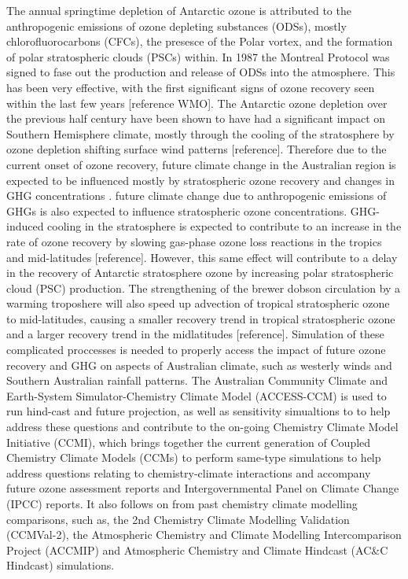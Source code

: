 The annual springtime depletion of Antarctic ozone is attributed to the anthropogenic emissions of ozone depleting substances (ODSs), mostly chlorofluorocarbons (CFCs), the presesce of the Polar vortex, and the formation of polar stratospheric clouds (PSCs) within. In 1987 the Montreal Protocol was signed to fase out the production and release of ODSs into the atmosphere. This has been very effective, with the first significant signs of ozone recovery seen within the last few years [reference WMO]. The Antarctic ozone depletion over the previous half century have been shown to have had a significant impact on Southern Hemisphere climate, mostly through the cooling of the stratosphere by ozone depletion shifting surface wind patterns [reference]. Therefore due to the current onset of ozone recovery, future climate change in the Australian region is expected to be influenced mostly by stratospheric ozone recovery and changes in GHG concentrations \cite{Arblaster_2011}. future climate change due to anthropogenic emissions of GHGs is also expected to influence stratospheric ozone concentrations. GHG-induced cooling in the stratosphere is expected to contribute to an increase in the rate of ozone recovery by slowing gas-phase ozone loss reactions in the tropics and mid-latitudes [reference]. However, this same effect will contribute to a delay in the recovery of Antarctic stratosphere ozone by increasing polar stratospheric cloud (PSC) production. The strengthening of the brewer dobson circulation by a warming troposhere will also speed up advection of tropical stratospheric ozone to mid-latitudes, causing a smaller recovery trend in tropical stratospheric ozone and a larger recovery trend in the midlatitudes [reference]. Simulation of these complicated proccesses is needed to properly access the impact of future ozone recovery and GHG on aspects of Australian climate, such as westerly winds and Southern Australian rainfall patterns. The Australian Community Climate and Earth-System Simulator-Chemistry Climate Model (ACCESS-CCM) is used to run hind-cast and future projection, as well as sensitivity simualtions to to help address these questions and contribute to the on-going Chemistry Climate Model Initiative (CCMI), which brings together the current generation of Coupled Chemistry Climate Models (CCMs) to perform same-type simulations to help address questions relating to chemistry-climate interactions and accompany future ozone assessment reports and Intergovernmental Panel on Climate Change (IPCC) reports. It also follows on from past chemistry climate modelling comparisons, such as, the 2nd Chemistry Climate Modelling Validation (CCMVal-2), the Atmospheric Chemistry and Climate Modelling Intercomparison Project (ACCMIP) and Atmospheric Chemistry and Climate Hindcast (AC&C Hindcast) simulations. 

